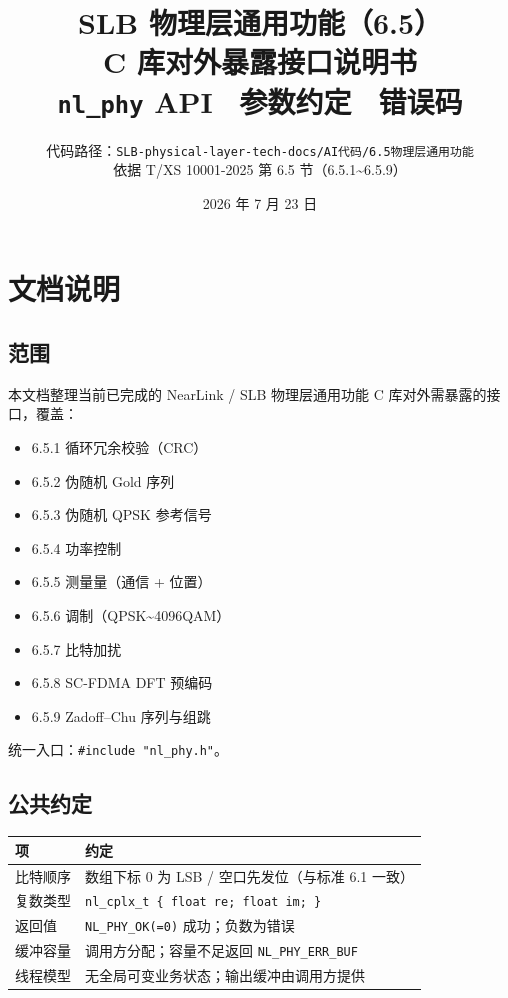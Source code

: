 \documentclass[11pt,a4paper]{ctexart}
\title{%
  \textbf{SLB 物理层通用功能（6.5）}\\[0.35em]
  \Large C 库对外暴露接口说明书\\[0.25em]
  \large \texttt{nl\_phy} API \textbullet\ 参数约定 \textbullet\ 错误码
}
\author{%
  代码路径：\texttt{SLB-physical-layer-tech-docs/AI代码/6.5物理层通用功能}\\
  依据 T/XS 10001-2025 第 6.5 节（6.5.1\textasciitilde 6.5.9）
}
\date{2026 年 7 月 23 日}
\begin{document}
\maketitle
\tableofcontents
\newpage

\section{文档说明}

\subsection{范围}

本文档整理当前已完成的 NearLink / SLB 物理层通用功能 C 库对外需暴露的接口，覆盖：

\begin{itemize}[nosep]
  \item 6.5.1 循环冗余校验（CRC）
  \item 6.5.2 伪随机 Gold 序列
  \item 6.5.3 伪随机 QPSK 参考信号
  \item 6.5.4 功率控制
  \item 6.5.5 测量量（通信 + 位置）
  \item 6.5.6 调制（QPSK\textasciitilde 4096QAM）
  \item 6.5.7 比特加扰
  \item 6.5.8 SC-FDMA DFT 预编码
  \item 6.5.9 Zadoff--Chu 序列与组跳
\end{itemize}

统一入口：\texttt{\#include "nl\_phy.h"}。

\subsection{公共约定}

\begin{table}[h]
\centering
\small
\begin{tabular}{ll}
\toprule
\textbf{项} & \textbf{约定} \\
\midrule
比特顺序 & 数组下标 0 为 LSB / 空口先发位（与标准 6.1 一致） \\
复数类型 & \texttt{nl\_cplx\_t \{ float re; float im; \}} \\
返回值 & \texttt{NL\_PHY\_OK(=0)} 成功；负数为错误 \\
缓冲容量 & 调用方分配；容量不足返回 \texttt{NL\_PHY\_ERR\_BUF} \\
线程模型 & 无全局可变业务状态；输出缓冲由调用方提供 \\
\bottomrule
\end{tabular}
\end{table}
\end{document}
